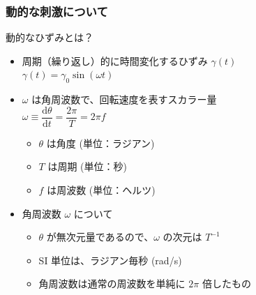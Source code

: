 \documentclass[unicode,12pt]{beamer}%
\begin{document}
\begin{frame}
	\frametitle{動的な刺激について}
	\begin{block}{動的なひずみとは？}
		\begin{itemize}
			\item 周期（繰り返し）的に時間変化するひずみ $\gamma (t)$\\
			$\gamma (t) = \gamma_0 \sin(\omega t)$
			\item $\omega$ は角周波数で、回転速度を表すスカラー量\\
			$\omega \equiv \dfrac{\mathrm{d} \theta}{\mathrm{d} t} = \dfrac{2 \pi}{T} = 2\pi f$
			\begin{itemize}
				\item $\theta$ は角度 (単位：ラジアン)
				\item $T$ は周期 (単位：秒)
				\item $f$ は周波数 (単位：ヘルツ)
				
			\end{itemize}
			\item 角周波数 $\omega$ について
			\begin{itemize}
				\item $\theta$ が無次元量であるので、$\omega$ の次元は $T^{-1}$
				\item SI 単位は、ラジアン毎秒 (rad/s)
				\item 角周波数は通常の周波数を単純に $2\pi$ 倍したもの
			\end{itemize}
		\end{itemize}
	\end{block}

\end{frame}
\end{document}
